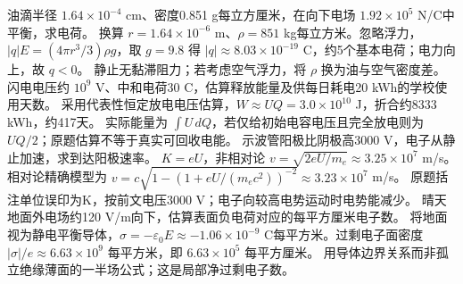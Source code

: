 \problemtext 油滴半径 $1.64\times10^{-4}$ cm、密度0.851 g每立方厘米，在向下电场 $1.92\times10^5$ N/C中平衡，求电荷。
\workings 换算 $r=1.64\times10^{-6}$ m、$\rho=851$ kg每立方米。忽略浮力，$|q|E=(4\pi r^3/3)\rho g$，取 $g=9.8$ 得 $|q|\approx8.03\times10^{-19}$ C，约5个基本电荷；电力向上，故 $q<0$。
\crosscheck 静止无黏滞阻力；若考虑空气浮力，将 $\rho$ 换为油与空气密度差。
\problemtext 闪电电压约 $10^9$ V、中和电荷30 C，估算释放能量及供每日耗电20 kWh的学校使用天数。
\workings 采用代表性恒定放电电压估算，$W\approx UQ=3.0\times10^{10}$ J，折合约8333 kWh，约417天。
\crosscheck 实际能量为 $\int U\,dQ$，若仅给初始电容电压且完全放电则为 $UQ/2$；原题估算不等于真实可回收电能。
\problemtext 示波管阳极比阴极高3000 V，电子从静止加速，求到达阳极速率。
\workings $K=eU$，非相对论 $v=\sqrt{2eU/m_e}\approx3.25\times10^7$ m/s。相对论精确模型为 $v=c\sqrt{1-(1+eU/(m_ec^2))^{-2}}\approx3.23\times10^7$ m/s。
\crosscheck 原题括注单位误印为K，按前文电压3000 V；电子向较高电势运动时电势能减少。
\problemtext 晴天地面外电场约120 V/m向下，估算表面负电荷对应的每平方厘米电子数。
\workings 将地面视为静电平衡导体，$\sigma=-\varepsilon_0 E\approx-1.06\times10^{-9}$ C每平方米。过剩电子面密度 $|\sigma|/e\approx6.63\times10^9$ 每平方米，即 $6.63\times10^5$ 每平方厘米。
\crosscheck 用导体边界关系而非孤立绝缘薄面的一半场公式；这是局部净过剩电子数。
